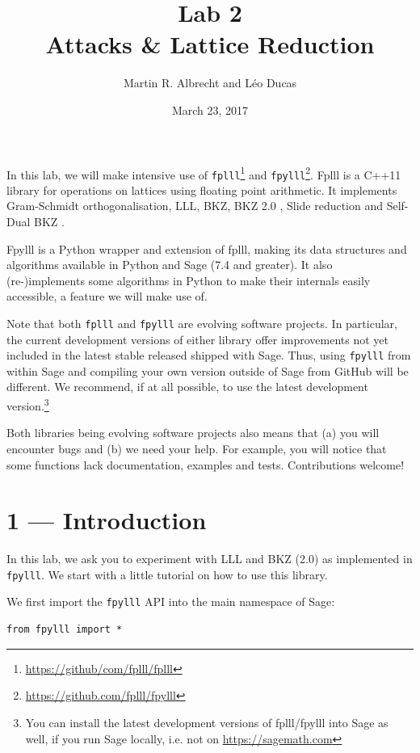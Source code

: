 \documentclass[10pt,a4paper]{tufte-handout}
\author{Martin R. Albrecht and Léo Ducas}
\date{March 23, 2017}
\title{Lab 2\\\medskip
\large Attacks \& Lattice Reduction}
\begin{document}
\maketitle
In this lab, we will make intensive use of \texttt{fplll}\footnote{\url{https://github/com/fplll/fplll}} and \texttt{fpylll}\footnote{\url{https://github.com/fplll/fpylll}}. Fplll is a C++11 library for operations on lattices using floating point arithmetic. It implements Gram-Schmidt orthogonalisation, LLL, BKZ, BKZ 2.0 , Slide reduction  and Self-Dual BKZ .

Fpylll is a Python wrapper and extension of fplll, making its data structures and algorithms available in Python and Sage (7.4 and greater). It also (re-)implements some algorithms in Python to make their internals easily accessible, a feature we will make use of.

Note that both \texttt{fplll} and \texttt{fpylll} are evolving software projects. In particular, the current development versions of either library offer improvements not yet included in the latest stable released shipped with Sage. Thus, using \texttt{fpylll} from within Sage and compiling your own version outside of Sage from GitHub will be different. We recommend, if at all possible, to use the latest development version.\footnote{You can install the latest development versions of fplll/fpylll into Sage as well, if you run Sage locally, i.e. not on \url{https://sagemath.com}}

Both libraries being evolving software projects also means that (a) you will encounter bugs and (b) we need your help. For example, you will notice that some functions lack documentation, examples and tests. Contributions welcome!

\section{1 — Introduction}
\label{sec:orgad87612}
In this lab, we ask you to experiment with LLL and BKZ (2.0) as implemented in \texttt{fpylll}. We start with a little tutorial on how to use this library.

We first import the \texttt{fpylll} API into the main namespace of Sage:

\lstset{language=sage,label= ,caption= ,captionpos=b,numbers=none}
\begin{lstlisting}
from fpylll import *
\end{lstlisting}
\end{document}
